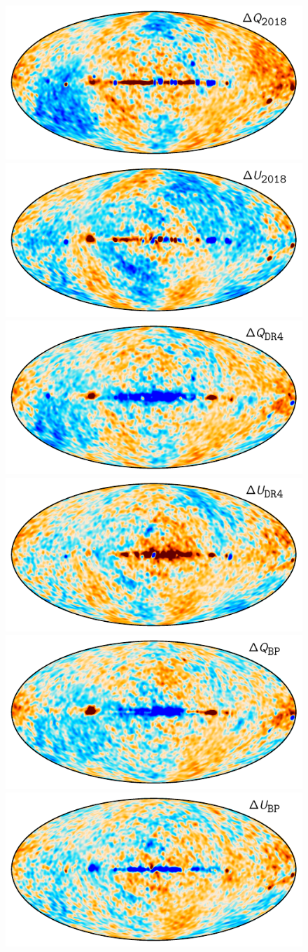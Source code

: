 \documentclass[twocolumn]{aa}
\begin{document}
\begin{figure}[t]
    \center
    \includegraphics[width=0.47\linewidth]{figs/diff_dpc_k_3deg_Q.pdf}
    \includegraphics[width=0.47\linewidth]{figs/diff_dpc_k_3deg_U.pdf}\\
    \includegraphics[width=0.47\linewidth]{figs/diff_npipe_k_3deg_Q.pdf}
    \includegraphics[width=0.47\linewidth]{figs/diff_npipe_k_3deg_U.pdf}\\
    \includegraphics[width=0.47\linewidth]{figs/diff_bp10_k_3deg_Q.pdf}
    \includegraphics[width=0.47\linewidth]{figs/diff_bp10_k_3deg_U.pdf}\\

\end{figure}
\end{document}
